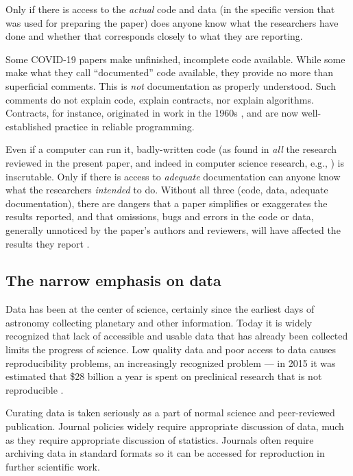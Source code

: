 \documentclass{comjnl}
\begin{document}
Only if there is access to the \emph{actual\/} code and data (in the specific version that was used for preparing the paper) does anyone know what the researchers have done and whether that corresponds closely to what they are reporting.

Some COVID-19 papers  make unfinished, incomplete code available. While some  make what they call ``documented'' code available, they provide no more than superficial comments. This is \emph{not\/} documentation as properly understood. Such comments do not explain code, explain contracts, nor explain algorithms. Contracts, for instance, originated in work in the 1960s \cite{hoare}, and are now well-established practice in reliable programming.

Even if a computer can run it, badly-written code (as found in \emph{all\/} the research reviewed in the present paper, and indeed in computer science research, e.g., \cite{machine-learning-reproducibility}) is inscrutable. Only if there is access to \emph{adequate\/} documentation can anyone know what the researchers \emph{intended\/} to do. Without all three (code, data, adequate documentation), there are dangers that a paper simplifies or exaggerates the results reported, and that omissions, bugs and errors in the code or data, generally unnoticed by the paper's authors and reviewers, will have affected the results they report \cite{relit}. 

\label{section-discussion}
\subsection{The narrow emphasis on data}
\label{critique-fair}
Data has been at the center of science, certainly since the earliest days of astronomy collecting planetary and other information. Today it is widely recognized that lack of accessible and usable data that has already been collected limits the progress of science. Low quality data and poor access to data causes reproducibility problems, an increasingly recognized problem --- in 2015 it was estimated that \$28 billion a year is spent on preclinical research that is not reproducible \cite{preclinical-reproducibility}.

Curating data is taken seriously as a part of normal science and peer-reviewed publication. Journal policies widely require appropriate discussion of data, much as they require appropriate discussion of statistics. Journals often require archiving data in standard formats so it can be accessed for reproduction in further scientific work. 
\end{document}
